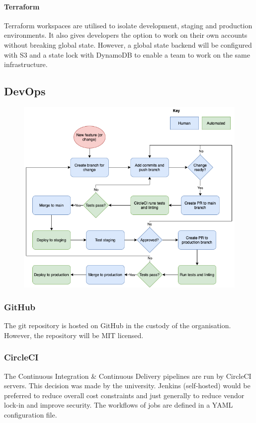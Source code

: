\documentclass[10pt]{article}
\begin{document}
\paragraph{Terraform}
Terraform workspaces are utilised to isolate development, staging and production environments. It also gives developers the option to work on their own accounts without breaking global state. However, a global state backend will be configured with S3 and a state lock with DynamoDB to enable a team to work on the same infrastructure.

\newpage
\subsection{DevOps}
\begin{figure}[h!]
	\centering
	\includegraphics[width=0.9\linewidth]{images/DevOpsWorkflow.png}	
\end{figure}

\subsubsection{GitHub}
The git repository is hosted on GitHub in the custody of the organisation. However, the repository will be MIT licensed.
\subsubsection{CircleCI}
The Continuous Integration \& Continuous Delivery pipelines are run by CircleCI servers. This decision was made by the university. Jenkins (self-hosted) would be preferred to reduce overall cost constraints and just generally to reduce vendor lock-in and improve security. The workflows of jobs are defined in a YAML configuration file. 
\end{document}
